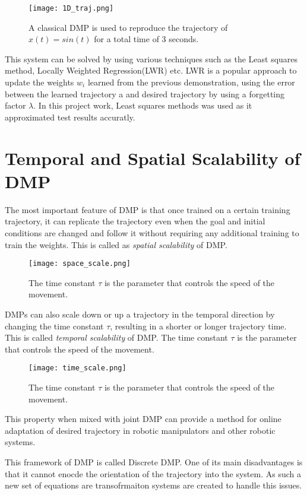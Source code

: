 \begin{figure}[h]
    \centering
    \texttt{[image: 1D\_traj.png]}
    \caption{A classical DMP is used to reproduce the trajectory of $x(t) = sin(t)$ for a total time of 3 seconds.} %
\end{figure}
This system can be solved by using various techniques such as the Least squares method, Locally Weighted Regression(LWR) etc.
LWR is a popular approach to update the weights $w_i$ learned from the previous demonstration, using the error between the learned trajectory a
and desired trajectory by using a forgetting factor $\lambda$. In this project work, Least squares methods was used as it approximated test results accuratly.

\section{Temporal and Spatial Scalability of DMP}

The most important feature of DMP is that once trained on a certain training trajectory, it can replicate the trajectory
even when the goal and initial conditions are changed and follow it without requiring any additional training to train the weights. This is called
as \textit{spatial scalability} of DMP.

\begin{figure}[h]
    \centering
    \texttt{[image: space\_scale.png]}
    \caption{The time constant $\tau$ is the parameter that controls the speed of the movement.}
\end{figure}
DMPs can also scale down or up a trajectory in the temporal direction by changing the time constant $\tau$, resulting in a shorter or longer trajectory time.
This is called \textit{temporal scalability} of DMP. The time constant $\tau$ is the parameter that controls the speed of the movement.
\begin{figure}[h]
    \centering
    \texttt{[image: time\_scale.png]}
    \caption{The time constant $\tau$ is the parameter that controls the speed of the movement.}
\end{figure}

This property when mixed with joint DMP can provide a method for online adaptation of desired trajectory in robotic manipulators and other robotic systems.

This framework of DMP is called Discrete DMP. One of its main disadvantages is that it cannot enocde the orientation of the trajectory into the system.
As such a new set of equations are transofrmaiton systems are created to handle this issues.